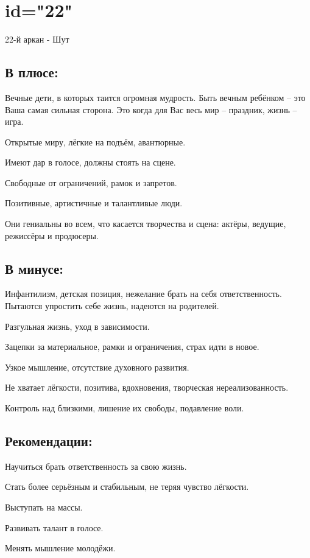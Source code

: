 \endsection

\section{id="22"}{22-й аркан - Шут}

\subsection{В плюсе:}
\item Вечные дети, в которых таится огромная мудрость. Быть вечным ребёнком – это Ваша самая сильная сторона. Это когда для Вас весь мир – праздник, жизнь – игра.
\item Открытые миру, лёгкие на подъём, авантюрные.
\item Имеют дар в голосе, должны стоять на сцене.
\item Свободные от ограничений, рамок и запретов.
\item Позитивные, артистичные и талантливые люди.
\item Они гениальны во всем, что касается творчества и сцена: актёры, ведущие, режиссёры и продюсеры.
\endsubsection

\subsection{В минусе:}
\item Инфантилизм, детская позиция, нежелание брать на себя ответственность. Пытаются упростить себе жизнь, надеются на родителей.
\item Разгульная жизнь, уход в зависимости.
\item Зацепки за материальное, рамки и ограничения, страх идти в новое.
\item Узкое мышление, отсутствие духовного развития.
\item Не хватает лёгкости, позитива, вдохновения, творческая нереализованность.
\item Контроль над близкими, лишение их свободы, подавление воли.
\endsubsection

\subsection{Рекомендации:}
\item Научиться брать ответственность за свою жизнь.
\item Стать более серьёзным и стабильным, не теряя чувство лёгкости.
\item Выступать на массы.
\item Развивать талант в голосе.
\item Менять мышление молодёжи.
\endsubsection

\endsection
